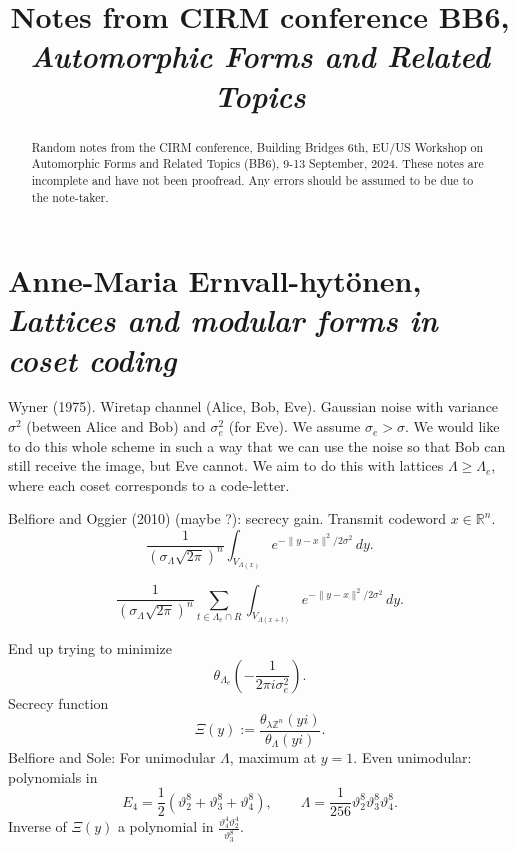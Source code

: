 \documentclass[reqno]{amsart} 
\begin{document}
\title{Notes from CIRM conference BB6, \emph{Automorphic Forms and Related Topics}} 

\begin{abstract}
  Random notes from the CIRM conference, Building Bridges 6th, EU/US Workshop on Automorphic Forms and Related Topics (BB6),
  9-13 September, 2024.  These notes are incomplete and have not been proofread.  Any errors should be assumed to be due to the note-taker.
\end{abstract}


\section{Anne-Maria Ernvall-hytönen, \textnormal{\emph{Lattices and modular forms in coset coding}}}

Wyner (1975).  Wiretap channel (Alice, Bob, Eve).  Gaussian noise with variance $\sigma^2$ (between Alice and Bob) and $\sigma_e^2$ (for Eve).  We assume $\sigma_e > \sigma$.  We would like to do this whole scheme in such a way that we can use the noise so that Bob can still receive the image, but Eve cannot.  We aim to do this with lattices $\Lambda \geq \Lambda_e$, where each coset corresponds to a code-letter.

Belfiore and Oggier (2010) (maybe \cite{MR4032962}?): secrecy gain.  Transmit codeword $x \in \mathbb{R}^n$.
\begin{equation*}
  \frac{1}{(\sigma_\Lambda \sqrt{2 \pi})^n}
  \int_{V_{\Lambda(x)}}
  e^{- \lVert y - x \rVert^2 / 2 \sigma^2} \, d y.
\end{equation*}

\begin{equation*}
  \frac{1}{(\sigma_\Lambda \sqrt{2 \pi})^n}
  \sum_{t \in \Lambda_e \cap R}
  \int_{V_{\Lambda(x + t)}}
  e^{- \lVert y - x \rVert^2 / 2 \sigma^2} \, d y.
\end{equation*}

End up trying to minimize
\begin{equation*}
  \theta_{\Lambda_e} \left( - \frac{1}{2 \pi i \sigma_e^2} \right).
\end{equation*}
Secrecy function
\begin{equation*}
  \Xi(y) :=
  \frac{\theta_{\lambda \mathbb{Z}^n}(y i)}{ \theta_\Lambda(y i)}.
\end{equation*}
Belfiore and Sole: For unimodular $\Lambda$, maximum at $y = 1$.  Even unimodular: polynomials in
\begin{equation*}
  E_4 = \frac{1}{2} \left( \vartheta_2^8 + \vartheta_3^8 + \vartheta_4^8  \right),
  \qquad
  \Lambda = \frac{1}{256} \vartheta_2^8 \vartheta_3^8 \vartheta_4^8.
\end{equation*}
Inverse of $\Xi(y)$ a polynomial in $\frac{\vartheta_4^4 \vartheta_2^4}{\vartheta_3^8}$.
\end{document}
